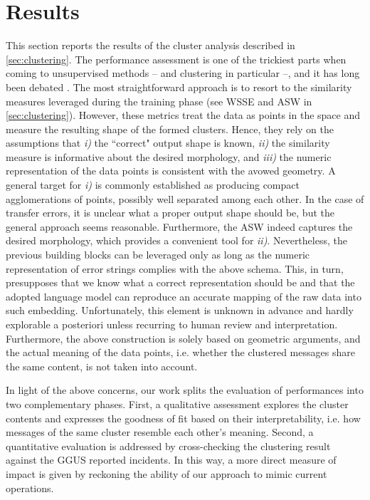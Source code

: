 \chapter{Results} 
\label{ch:opint-results}

This section reports the results of the cluster analysis described in \cref{sec:clustering}. 
The performance assessment is one of the trickiest parts when coming to unsupervised methods -- and clustering in particular --, and it has long been debated \cite{von2012clustering, guyon2009clustering}.
The most straightforward approach is to resort to the similarity measures leveraged during the training phase (see WSSE and ASW in \cref{sec:clustering}).
However, these metrics treat the data as points in the space and measure the resulting shape of the formed clusters. 
Hence, they rely on the assumptions that \textit{i)} the ``correct" output shape is known, \textit{ii)} the similarity measure is informative about the desired morphology, and \textit{iii)} the numeric representation of the data points is consistent with the avowed geometry.
A general target for \textit{i)} is commonly established as producing compact agglomerations of points, possibly well separated among each other. 
In the case of transfer errors, it is unclear what a proper output shape should be, but the general approach seems reasonable. Furthermore, the ASW indeed captures the desired morphology, which provides a convenient tool for \textit{ii)}.
Nevertheless, the previous building blocks can be leveraged only as long as the numeric representation of error strings complies with the above schema. 
This, in turn, presupposes that we know what a correct representation should be and that the adopted language model can reproduce an accurate mapping of the raw data into such embedding.
Unfortunately, this element is unknown in advance and hardly explorable a posteriori unless recurring to human review and interpretation.
Furthermore, the above construction is solely based on geometric arguments, and the actual meaning of the data points, i.e. whether the clustered messages share the same content, is not taken into account.

In light of the above concerns, our work splits the evaluation of performances into two complementary phases.
First, a qualitative assessment explores the cluster contents and expresses the goodness of fit based on their interpretability, i.e. how messages of the same cluster resemble each other's meaning.
Second, a quantitative evaluation is addressed by cross-checking the clustering result against the GGUS reported incidents. In this way, a more direct measure of impact is given by reckoning the ability of our approach to mimic current operations.

